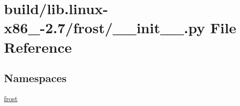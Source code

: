 \hypertarget{build_2lib_8linux-x86__64-2_87_2frost_2____init_____8py}{}\section{build/lib.linux-\/x86\+\_-\/2.7/frost/\+\_\+\+\_\+init\+\_\+\+\_\+.py File Reference}
\label{build_2lib_8linux-x86__64-2_87_2frost_2____init_____8py}
\subsection*{Namespaces}
\begin{DoxyCompactItemize}
\item 
 \hyperlink{namespacefrost}{frost}
\end{DoxyCompactItemize}
